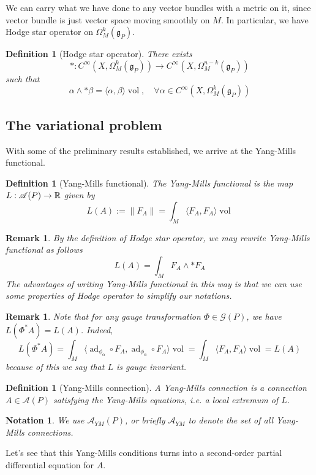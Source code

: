\documentclass[11pt]{amsart}
\numberwithin{equation}{section}
\theoremstyle{plain}
\theoremstyle{plain}
\newtheorem{defnsub}[thmsub]{Definition}
\newtheorem{remksub}[thmsub]{Remark}
\newtheorem{notasub}[thmsub]{Notation}
\numberwithin{equation}{section}
\begin{document}
We can carry what we have done to any vector bundles with a metric on it, since vector bundle is just vector space moving smoothly on $M$. In particular, we have Hodge star operator on $\Omega_M^k(\mathfrak{g}_P)$.
\begin{defnsub}[Hodge star operator]
There exists 
$$
*: C^{\infty}(X,\Omega_M^k(\mathfrak{g}_P))\to C^{\infty}(X,\Omega_{M}^{n-k}(\mathfrak{g}_P))
$$
such that 
$$
\alpha\wedge*\beta=\langle\alpha,\beta\rangle\operatorname{vol},\quad \forall\alpha\in C^{\infty}(X,\Omega_M^k(\mathfrak{g}_P))
$$
\end{defnsub}

\subsection{The variational problem}
With some of the preliminary results established, we arrive at the Yang-Mills functional.
\begin{defnsub}[Yang-Mills functional]
The Yang-Mills functional is the map $L:\mathscr{A}(P)\to \Bbb{R}$ given by
$$
L(A):=\|F_A\|=\int_M\langle F_A,F_A\rangle\operatorname{vol}
$$
\end{defnsub}
\begin{remksub}\normalfont
By the definition of Hodge star operator, we may rewrite Yang-Mills functional as follows
$$
L(A)=\int_MF_A\wedge *F_A
$$
The advantages of writing Yang-Mills functional in this way is that we can use some properties of Hodge operator to simplify our notations.
\end{remksub}
\begin{remksub}\normalfont
Note that for any gauge transformation $\Phi\in\mathscr{G}(P)$, we have $L(\Phi^*A)=L(A)$. Indeed,
$$
L(\Phi^*A)=\int_M\langle\operatorname{ad}_{\phi_{\alpha}}\circ F_A,\operatorname{ad}_{\phi_{\alpha}}\circ F_A\rangle\operatorname{vol}=\int_M \langle F_A,F_A\rangle\operatorname{vol}=L(A)
$$
because of this we say that $L$ is gauge invariant.
\end{remksub}

\begin{defnsub}[Yang-Mills connection]
A Yang-Mills connection is a connection $A\in\mathscr{A}(P)$ satisfying the Yang-Mills equations, i.e. a local extremum of $L$.
\end{defnsub}
\begin{notasub}\normalfont
We use $\mathscr{A}_{YM}(P)$, or briefly $\mathscr{A}_{YM}$ to denote the set of all Yang-Mills connections.
\end{notasub}
Let's see that this Yang-Mills conditions turns into a second-order partial differential equation for $A$.
\end{document}
